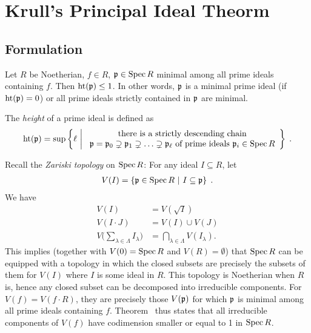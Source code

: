 \documentclass[a4paper,parskip=full,numbers=enddot]{scrreprt}
\begin{document}
\chapter{Krull's Principal Ideal Theorm}
\section{Formulation}
\setcounter{thm}{10}
\begin{thm}
    Let $R$ be Noetherian, $f\in R$, $\mathfrak{p}\in \operatorname{Spec} R$ minimal among all prime ideals containing $f$. Then $\operatorname{ht}(\mathfrak{p}) \leq 1$. In other words, $\mathfrak{p}$ is a minimal prime ideal (if $\operatorname{ht}(\mathfrak{p}) =0$) or all prime ideals strictly contained in $\mathfrak{p}$ are minimal.
\end{thm}
\begin{rem*}
    \begin{alphanumerate}
    \item
        The \emph{height} of a prime ideal is defined as
        \begin{align*}
            \operatorname{ht}(\mathfrak{p}) = \sup\left\{\ell\ \middle|\ 
            \begin{array}{c}
	            \text{there is a strictly descending chain}\\
	            \mathfrak{p}=\mathfrak{p}_0\supsetneq\mathfrak{p}_1\supsetneq\ldots\supsetneq\mathfrak{p}_\ell\text{ of prime ideals }\mathfrak{p}_i\in\operatorname{Spec} R
            \end{array}\right\}\;.
        \end{align*}
    \item
        Recall the \emph{Zariski topology} on $\operatorname{Spec} R$: For any ideal $I\subseteq R$, let 
        \begin{align*}
        	V(I) = \left\{\mathfrak{p}\in\operatorname{Spec} R\ \middle|\  I\subseteq \mathfrak{p}\right\}\;.
        \end{align*}
        We have
        \begin{align*}
            V(I)& = V\left(\sqrt{I}\right)\\
            V(I\cdot J ) &= V(I) \cup V(J)\\
            V\bigg(\sum_{\lambda\in\Lambda} I_\lambda\bigg) &= \bigcap_{\lambda\in\Lambda} V(I_\lambda).
        \end{align*}
        This implies (together with $V(0) = \operatorname{Spec} R$ and $V(R) = \emptyset$) that $\operatorname{Spec} R$ can be equipped with a topology in which the closed subsets are precisely the subsets of them for $V(I)$ where $I$ is some ideal in $R$. This topology is Noetherian when $R$ is, hence any closed subset can be decomposed into irreducible components. For $V(f) = V(f\cdot R)$, they are precisely those $V(\mathfrak{p})$ for which $\mathfrak{p}$ is minimal among all prime ideals containing $f$. Theorem~ thus states that all irreducible components of $V(f)$ have codimension smaller or equal to 1 in $\operatorname{Spec} R$. 
    \end{alphanumerate}
\end{rem*}
\end{document}
